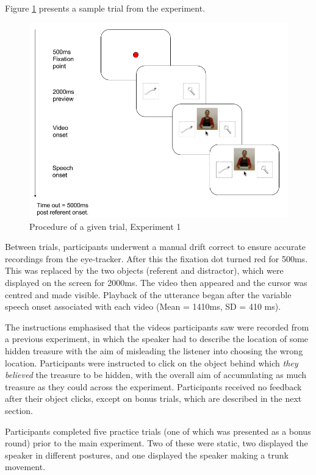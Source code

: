 \documentclass[a4paper,man,natbib]{apa6}
\begin{document}
Figure \ref{fig:v1_trial} presents a sample trial from the experiment. 
\begin{figure}[Ht]
  \centering
	\includegraphics[width=\linewidth]{./img/e7_trial.png}
  \caption{Procedure of a given trial, Experiment 1}
  \label{fig:v1_trial}
\end{figure}
Between trials, participants underwent a manual drift correct to ensure accurate recordings from the eye-tracker. %
After this the fixation dot turned red for 500ms. 
This was replaced by the two objects (referent and distractor), which were displayed on the screen for 2000ms.
The video then appeared and the cursor was centred and made visible.
Playback of the utterance began after the variable speech onset associated with each video (Mean = 1410ms, SD = 410 ms). 

The instructions emphasised that the videos participants saw were recorded from a previous experiment, in which the speaker had to describe the location of some hidden treasure with the aim of misleading the listener into choosing the wrong location.
Participants were instructed to click on the object behind which \textit{they believed} the treasure to be hidden, with the overall aim of accumulating as much treasure as they could across the experiment.
Participants received no feedback after their object clicks, except on bonus trials, which are described in the next section.

Participants completed five practice trials (one of which was presented as a bonus round) prior to the main experiment. 
Two of these were static, two displayed the speaker in different postures, and one displayed the speaker making a trunk movement. %
\end{document}

